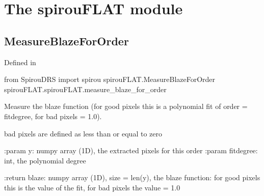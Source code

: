 
\clearpage
\newpage
\begin{minipage}{\textwidth}
\section{The spirouFLAT module}
\label{ch:the_module:spirouFLAT}

\subsection{MeasureBlazeForOrder}

Defined in \spirouFLAT{}

\begin{pythonbox}
from SpirouDRS import spirou
spirouFLAT.MeasureBlazeForOrder
spirouFLAT.spirouFLAT.measure_blaze_for_order
\end{pythonbox}

\begin{pythondocstring}
Measure the blaze function (for good pixels this is a polynomial fit of
order = fitdegree, for bad pixels = 1.0).

bad pixels are defined as less than or equal to zero

:param y: numpy array (1D), the extracted pixels for this order
:param fitdegree: int, the polynomial degree

:return blaze: numpy array (1D), size = len(y), the blaze function: for
               good pixels this is the value of the fit, for bad pixels the
               value = 1.0
\end{pythondocstring}
\end{minipage}


